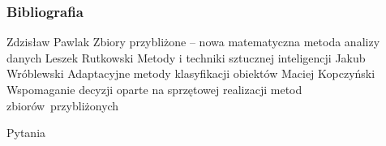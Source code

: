 \documentclass[10pt]{beamer}
\begin{document}

\begin{frame}
\frametitle{Bibliografia}
\footnotesize
{
\begin{thebibliography}{99}
 Zdzisław Pawlak
\newblock Zbiory przybliżone -- nowa matematyczna metoda analizy danych 
 Leszek Rutkowski
\newblock Metody i techniki sztucznej inteligencji
 Jakub Wróblewski
\newblock Adaptacyjne metody klasyfikacji obiektów
 Maciej Kopczyński
\newblock Wspomaganie decyzji oparte na sprzętowej realizacji metod zbiorów~przybliżonych
\end{thebibliography}
}
\end{frame}


{\1
\begin{frame}
  \finalpage
  {
  \begin{huge}
  	Pytania
  \end{huge}
  
  }
\end{frame}
}
\end{document}
